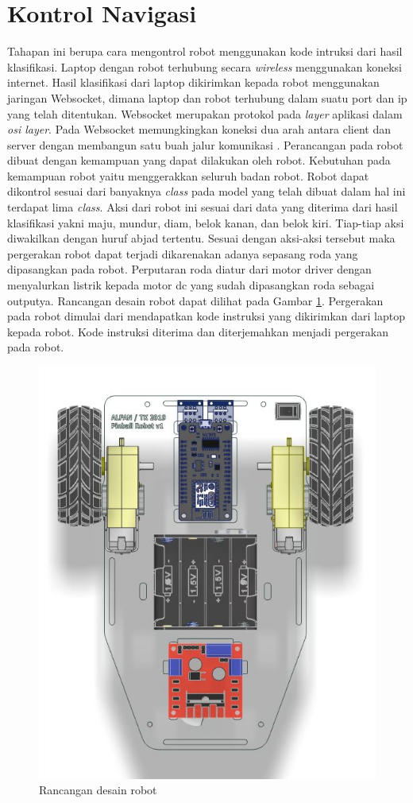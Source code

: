 \section{Kontrol Navigasi} 
Tahapan ini berupa cara mengontrol robot menggunakan kode intruksi dari hasil klasifikasi. Laptop dengan robot terhubung secara \emph{wireless} menggunakan koneksi internet. Hasil klasifikasi dari laptop dikirimkan kepada robot menggunakan jaringan Websocket, dimana laptop dan robot terhubung dalam suatu port dan ip yang telah ditentukan. Websocket merupakan protokol pada \emph{layer} aplikasi dalam \emph{osi layer}. Pada Websocket memungkingkan koneksi dua arah antara client dan server dengan membangun satu buah jalur komunikasi \parencite{websocket}. Perancangan pada robot dibuat dengan kemampuan yang dapat dilakukan oleh robot. Kebutuhan pada kemampuan robot yaitu menggerakkan seluruh badan robot. Robot dapat dikontrol sesuai dari banyaknya \emph{class} pada model yang telah dibuat dalam hal ini terdapat lima \emph{class}. Aksi dari robot ini sesuai dari data yang diterima dari hasil klasifikasi yakni maju, mundur, diam, belok kanan, dan belok kiri. Tiap-tiap aksi diwakilkan dengan huruf abjad tertentu. Sesuai dengan aksi-aksi tersebut maka pergerakan robot dapat terjadi dikarenakan adanya sepasang roda yang dipasangkan pada robot. Perputaran roda diatur dari motor driver dengan menyalurkan listrik kepada motor dc yang sudah dipasangkan roda sebagai outputya. Rancangan desain robot dapat dilihat pada Gambar \ref{fig:rancanganrobot}. Pergerakan pada robot dimulai dari mendapatkan kode instruksi yang dikirimkan dari laptop kepada robot. Kode instruksi diterima dan diterjemahkan menjadi pergerakan pada robot. 

\begin{figure}[!h]
  \centering
  \includegraphics[width=0.5\linewidth]{../Gambar/rancnaganrobot.jpg}
  \caption{Rancangan desain robot}
  \label{fig:rancanganrobot}
\end{figure}
